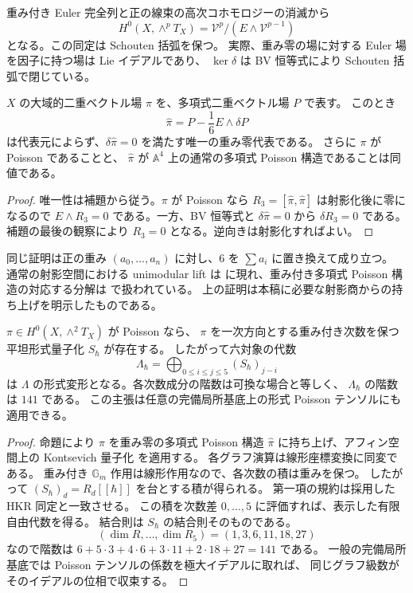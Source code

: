 重み付き Euler 完全列と正の線束の高次コホモロジーの消滅から
\[
 H^0(X,\wedge^pT_X)
 =\mathcal V^p/(E\wedge\mathcal V^{p-1})
\]
となる。この同定は Schouten 括弧を保つ。
実際、重み零の場に対する Euler 場を因子に持つ場は Lie イデアルであり、
$\ker\delta$ は BV 恒等式により Schouten 括弧で閉じている。

\begin{proposition}
\label{prop:weighted-poisson-lift-v31}
$X$ の大域的二重ベクトル場 $\pi$ を、多項式二重ベクトル場 $P$ で表す。
このとき
\[
 \widehat\pi=P-\frac16E\wedge\delta P
\]
は代表元によらず、$\delta\widehat\pi=0$ を満たす唯一の重み零代表である。
さらに $\pi$ が Poisson であることと、
$\widehat\pi$ が $\mathbb A^4$ 上の通常の多項式 Poisson 構造であることは同値である。
\end{proposition}

\begin{proof}
唯一性は補題から従う。$\pi$ が Poisson なら
$R_3=[\widehat\pi,\widehat\pi]$ は射影化後に零になるので
$E\wedge R_3=0$ である。一方、BV 恒等式と
$\delta\widehat\pi=0$ から $\delta R_3=0$ である。
補題の最後の観察により $R_3=0$ となる。逆向きは射影化すればよい。
\end{proof}

同じ証明は正の重み $(a_0,\ldots,a_n)$ に対し、$6$ を
$\sum a_i$ に置き換えて成り立つ。
通常の射影空間における unimodular lift は
\cite[\S 2.2]{Pym} に現れ、重み付き多項式 Poisson 構造の対応する分解は
\cite{TWW} で扱われている。
上の証明は本稿に必要な射影商からの持ち上げを明示したものである。

\begin{corollary}
\label{cor:all-poisson-directions-v31}
$\pi\in H^0(X,\wedge^2T_X)$ が Poisson なら、
$\pi$ を一次方向とする重み付き次数を保つ平坦形式量子化 $S_\hbar$ が存在する。
したがって六対象の代数
\[
 \Lambda_\hbar
 =\bigoplus_{0\leq i\leq j\leq5}(S_\hbar)_{j-i}
\]
は $\Lambda$ の形式変形となる。各次数成分の階数は可換な場合と等しく、
$\Lambda_\hbar$ の階数は $141$ である。
この主張は任意の完備局所基底上の形式 Poisson テンソルにも適用できる。
\end{corollary}

\begin{proof}
命題により $\pi$ を重み零の多項式 Poisson 構造
$\widehat\pi$ に持ち上げ、アフィン空間上の Kontsevich 量子化
\cite{Kontsevich} を適用する。
各グラフ演算は線形座標変換に同変である。
重み付き $\mathbb G_m$ 作用は線形作用なので、各次数の積は重みを保つ。
したがって $(S_\hbar)_d=R_d[[\hbar]]$ を台とする積が得られる。
第一項の規約は採用した HKR 同定と一致させる。
この積を次数差 $0,\ldots,5$ に評価すれば、表示した有限自由代数を得る。
結合則は $S_\hbar$ の結合則そのものである。
\[
 (\dim R,\ldots,\dim R_5)=(1,3,6,11,18,27)
\]
なので階数は
$6+5\cdot3+4\cdot6+3\cdot11+2\cdot18+27=141$ である。
一般の完備局所基底では Poisson テンソルの係数を極大イデアルに取れば、
同じグラフ級数がそのイデアルの位相で収束する。
\end{proof}

